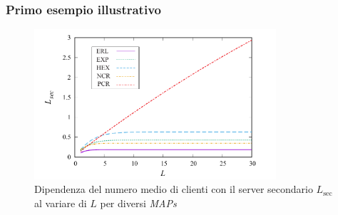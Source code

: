 \documentclass{beamer}
\begin{document}


    \begin{frame}
    \frametitle{Primo esempio illustrativo}
    \begin{figure}[h]
        \centering
        \includegraphics[width=0.8\textwidth]{Tcjl81t.png}
        \caption{Dipendenza del numero medio di clienti con il server secondario $L_{\mathrm{sec}}$ al variare di $L$ per diversi \emph{MAPs}}
        \label{fig:2}
    \end{figure}
\end{frame}


\end{document}

